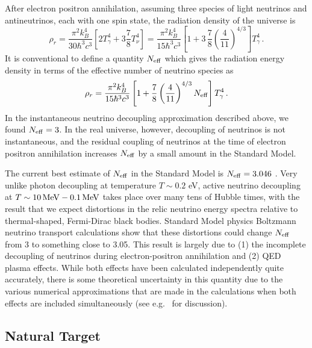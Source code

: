 After electron positron annihilation, assuming three species of light neutrinos and antineutrinos, each with one spin state, the radiation density of the universe is
\begin{equation}
	\rho_r = \frac{\pi^2k_B^4}{30\hbar^3 c^3}\left[2T_\gamma^4 + 3\frac{7}{8}T_\nu^4\right] = \frac{\pi^2k_B^4}{15\hbar^3 c^3}\left[1+3\,\frac{7}{8}\left(\frac{4}{11}\right)^{4/3}\right] T_\gamma^4 \, .
\end{equation}
It is conventional to define a quantity $N_{\rm eff}$ which gives the radiation energy density in terms of the effective number of neutrino species as
\begin{equation}
	\rho_r = \frac{\pi^2k_B^4}{15\hbar^3 c^3}\left[1+\frac{7}{8}\left(\frac{4}{11}\right)^{4/3}N_{\rm eff}\right] T_\gamma^4 \, .
\end{equation}
In the instantaneous neutrino decoupling approximation described above, we found $N_{\rm eff} = 3$.  In the real universe, however, decoupling of neutrinos is not instantaneous, and the residual coupling of neutrinos at the time of electron positron annihilation increases $N_{\rm eff}$ by a small amount in the Standard Model.

The current best estimate of $N_{\rm eff}$ in the Standard Model is $N_{\rm eff} = 3.046$ \cite{Mangano:2005cc}.   Very unlike photon decoupling at temperature $T \sim 0.2$ eV, active neutrino decoupling at $T \sim 10 \, {\rm MeV} - 0.1 \, {\rm MeV}$ takes place over many tens of Hubble times, with the result that we expect distortions in the relic neutrino energy spectra relative to thermal-shaped, Fermi-Dirac black bodies. Standard Model physics Boltzmann neutrino transport calculations show that these distortions could change $N_{\rm eff}$ from 3 to something close to 3.05. This result is largely due to (1) the incomplete decoupling of neutrinos during electron-positron annihilation and (2) QED plasma effects.  While both effects have been calculated independently quite accurately, there is some theoretical uncertainty in this quantity due to the various numerical approximations that are made in the calculations when both effects are included simultaneously (see e.g.~\cite{Grohs:2015tfy} for discussion).  








\subsection{Natural Target}

